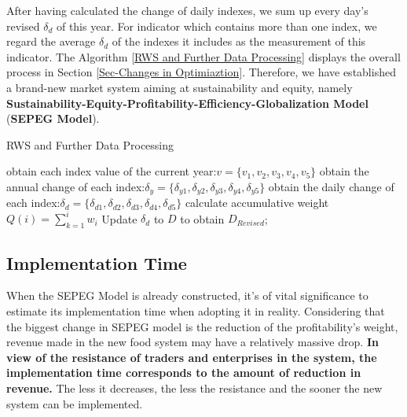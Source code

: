 \documentclass{mcmthesis}
\begin{document}
After having calculated the change of daily indexes, we sum up every day's revised $\delta_d$ of this year. For indicator which contains more than one index, we regard the average $\delta_d$ of the indexes it includes as the measurement of this indicator. The Algorithm \ref{RWS and Further Data Processing} displays the overall process in Section \ref{Sec-Changes in Optimiaztion}. Therefore, we have established a brand-new market system aiming at sustainability and equity, namely \textbf{Sustainability-Equity-Profitability-Efficiency-Globalization Model} (\textbf{SEPEG Model}).


\begin{algorithm}[H]
\label{RWS and Further Data Processing}
	\BlankLine
	\caption{RWS and Further Data Processing}
	\label{ps}
	obtain each index value of the current year:$v=\{v_1,v_2,v_3,v_4,v_5\}$\;
	obtain the annual change of each index:$\delta_y=\{\delta_{y1},\delta_{y2},\delta_{y3},\delta_{y4},\delta_{y5}\}$ \;
	obtain the daily change of each index:$\delta_d=\{\delta_{d1},\delta_{d2},\delta_{d3},\delta_{d4},\delta_{d5}\}$ \;
	calculate accumulative weight $Q(i)=\sum_{k=1}^{i}w_i$\;
	Update $\delta_{d}$ to $D$ to obtain $D_{Revised}$;
\end{algorithm}


\subsection{Implementation Time}
\label{Sec-imp}
When the SEPEG Model is already constructed, it's of vital significance to estimate its implementation time when adopting it in reality. Considering that the biggest change in SEPEG model is the reduction of the profitability's weight, revenue made in the new food system may have a relatively massive drop. \textbf{In view of the resistance of traders and enterprises in the system, the implementation time corresponds to the amount of reduction in revenue.} The less it decreases, the less the resistance and the sooner the new system can be implemented.
\end{document}
